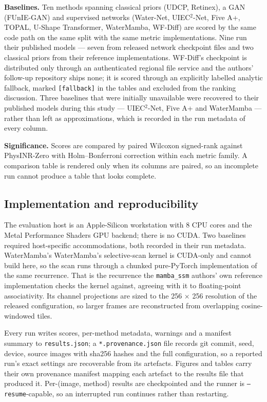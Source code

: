 \documentclass[journal]{IEEEtran}
\begin{document}
\textbf{Baselines.} Ten methods spanning classical priors (UDCP, Retinex), a GAN (FUnIE-GAN) and supervised networks (Water-Net, UIEC$^{2}$-Net, Five A+, TOPAL, U-Shape Transformer, WaterMamba, WF-Diff) are scored by the same code path on the same split with the same metric implementations. Nine run their published models --- seven from released network checkpoint files and two classical priors from their reference implementations. WF-Diff's checkpoint is distributed only through an authenticated regional file service and the authors' follow-up repository ships none; it is scored through an explicitly labelled analytic fallback, marked \texttt{[fallback]} in the tables and excluded from the ranking discussion. Three baselines that were initially unavailable were recovered to their published models during this study --- UIEC$^{2}$-Net, Five A+ and WaterMamba --- rather than left as approximations, which is recorded in the run metadata of every column.

\textbf{Significance.} Scores are compared by paired Wilcoxon signed-rank against PhysINR-Zero with Holm--Bonferroni correction within each metric family. A comparison table is rendered only when its columns are paired, so an incomplete run cannot produce a table that looks complete.

\subsection{Implementation and reproducibility}
The evaluation host is an Apple-Silicon workstation with 8 CPU cores and the Metal Performance Shaders GPU backend; there is no CUDA. Two baselines required host-specific accommodations, both recorded in their run metadata. WaterMamba's WaterMamba's selective-scan kernel is CUDA-only and cannot build here, so the scan runs through a chunked pure-PyTorch implementation of the same recurrence. That is the recurrence the \texttt{mamba\_ssm} authors' own reference implementation checks the kernel against, agreeing with it to floating-point associativity. Its channel projections are sized to the 256 $\times$ 256 resolution of the released configuration, so larger frames are reconstructed from overlapping cosine-windowed tiles.

Every run writes scores, per-method metadata, warnings and a manifest summary to \texttt{results.json}; a \texttt{*.provenance.json} file records git commit, seed, device, source images with sha256 hashes and the full configuration, so a reported run's exact settings are recoverable from its artefacts. Figures and tables carry their own provenance manifest mapping each artefact to the results file that produced it. Per-(image, method) results are checkpointed and the runner is \texttt{--resume}-capable, so an interrupted run continues rather than restarting.
\end{document}
